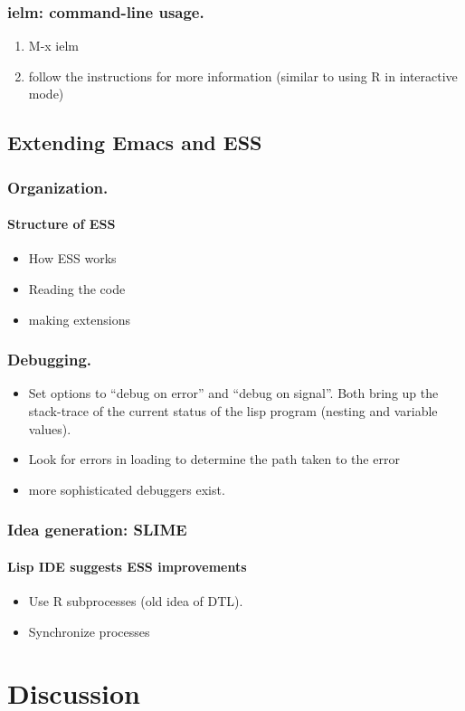 \documentclass{beamer}
\begin{document}
\begin{frame}
  \frametitle{ielm: command-line usage.}
  \begin{enumerate}
  \item M-x ielm
  \item follow the instructions for more information (similar to using
    R in interactive mode)
  \end{enumerate}
\end{frame}

\subsection{Extending Emacs and ESS}

\begin{frame}
  \frametitle{Organization.}
  \framesubtitle{Structure of ESS}
  \begin{itemize}
  \item How ESS works
  \item Reading the code
  \item making extensions
  \end{itemize}
\end{frame}

\begin{frame}
  \frametitle{Debugging.}
  \begin{itemize}
  \item Set options to ``debug on error'' and ``debug on signal''.
    Both bring up the stack-trace of the current status of the lisp
    program (nesting and variable values).
  \item Look for errors in loading to determine the path taken to the error
  \item more sophisticated debuggers exist.
  \end{itemize}
\end{frame}


\begin{frame}
  \frametitle{Idea generation: SLIME}
  \framesubtitle{Lisp IDE suggests ESS improvements}
  \begin{itemize}
  \item Use R subprocesses (old idea of DTL).
  \item Synchronize processes
  \end{itemize}
\end{frame}


\section{Discussion}
\end{document}
